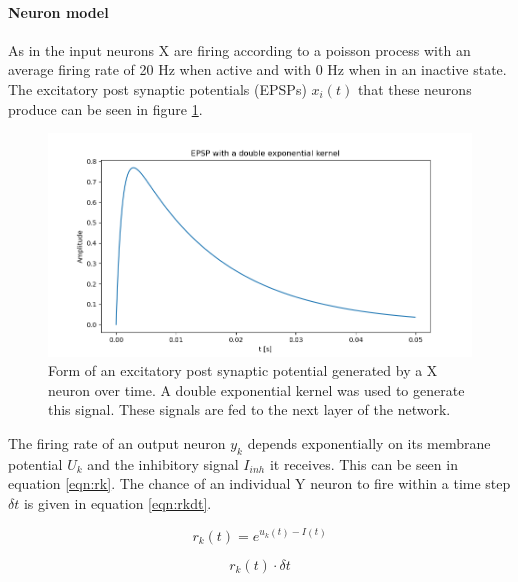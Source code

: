 \paragraph{Neuron model}

As in \citet{nessler} the input neurons X are firing according to a poisson process with an average firing rate of 20 Hz when active and with 0 Hz when in an inactive state. The excitatory post synaptic potentials (EPSPs) $x_i(t)$ that these neurons produce can be seen in figure \ref{fig:XSpike}.

\begin{figure}
  \includegraphics[width=\linewidth]{figures/XSpike.png}
  \caption{Form of an excitatory post synaptic potential generated by a X neuron over time. A double exponential kernel was used to generate this signal. These signals are fed to the next layer of the network. }
  \label{fig:XSpike}
\end{figure}

The firing rate of an output neuron $y_k$ depends exponentially on its membrane potential $U_k$ and the inhibitory signal $I_{inh}$ it receives. This can be seen in equation \ref{eqn:rk}. The chance of an individual Y neuron to fire within a time step $\delta t$ is given in equation \ref{eqn:rkdt}.

\begin{equation}
\label{eqn:rk}
r_k(t) = e^{u_k(t) - I(t)}
\end{equation}

\begin{equation}
\label{eqn:rkdt}
r_k(t) \cdot \delta t
\end{equation}

